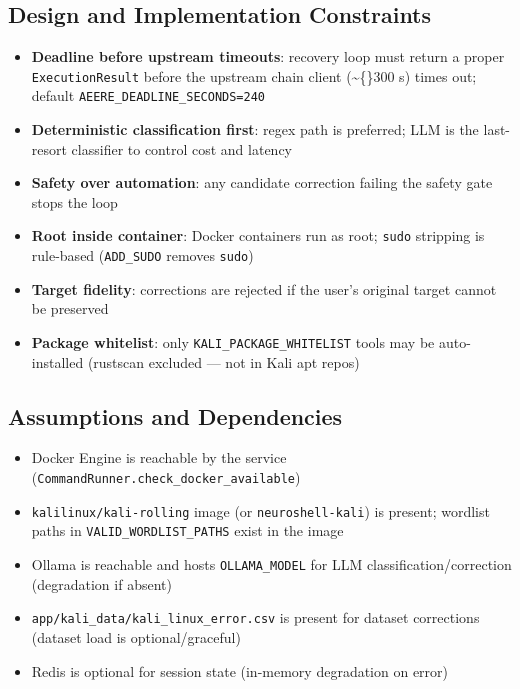 \documentclass[10pt,journal,onecolumn]{IEEEtran}
\begin{document}
\subsection{Design and Implementation Constraints}

\begin{itemize}
\item \textbf{Deadline before upstream timeouts}: recovery loop must return a proper \texttt{ExecutionResult} before the upstream chain client (\textasciitilde\{\}300 s) times out; default \texttt{AEERE\_\allowbreak DEADLINE\_\allowbreak SECONDS=240}
\item \textbf{Deterministic classification first}: regex path is preferred; LLM is the last-resort classifier to control cost and latency
\item \textbf{Safety over automation}: any candidate correction failing the safety gate stops the loop
\item \textbf{Root inside container}: Docker containers run as root; \texttt{sudo} stripping is rule-based (\texttt{ADD\_SUDO} removes \texttt{sudo})
\item \textbf{Target fidelity}: corrections are rejected if the user's original target cannot be preserved
\item \textbf{Package whitelist}: only \texttt{KALI\_PACKAGE\_WHITELIST} tools may be auto-installed (rustscan excluded --- not in Kali apt repos)
\end{itemize}

\subsection{Assumptions and Dependencies}

\begin{itemize}
\item Docker Engine is reachable by the service (\texttt{CommandRunner.\allowbreak check\_\allowbreak docker\_\allowbreak available})
\item \texttt{kalilinux/kali-rolling} image (or \texttt{neuroshell-kali}) is present; wordlist paths in \texttt{VALID\_WORDLIST\_PATHS} exist in the image
\item Ollama is reachable and hosts \texttt{OLLAMA\_MODEL} for LLM classification/correction (degradation if absent)
\item \texttt{app/\allowbreak kali\_\allowbreak data/\allowbreak kali\_\allowbreak linux\_\allowbreak error.\allowbreak csv} is present for dataset corrections (dataset load is optional/graceful)
\item Redis is optional for session state (in-memory degradation on error)
\end{itemize}
\end{document}
